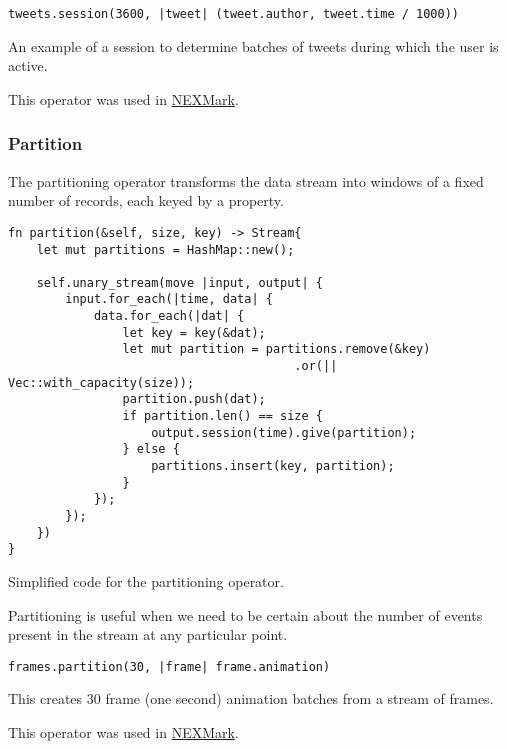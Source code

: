 \begin{listing}[H]
\begin{verbatim}
tweets.session(3600, |tweet| (tweet.author, tweet.time / 1000))
\end{verbatim}
\caption{An example of a session to determine batches of tweets during which the user is active.}
\label{lst:session-example}
\end{listing}

\noindent This operator was used in \hyperref[section:nexmark]{NEXMark}.

\subsubsection{Partition}
The partitioning operator transforms the data stream into windows of a fixed number of records, each keyed by a property.

\begin{listing}[H]
\begin{verbatim}
fn partition(&self, size, key) -> Stream{
    let mut partitions = HashMap::new();

    self.unary_stream(move |input, output| {
        input.for_each(|time, data| {
            data.for_each(|dat| {
                let key = key(&dat);
                let mut partition = partitions.remove(&key)
                                        .or(|| Vec::with_capacity(size));
                partition.push(dat);
                if partition.len() == size {
                    output.session(time).give(partition);
                } else {
                    partitions.insert(key, partition);
                }
            });
        });
    })
}
\end{verbatim}
  \caption{Simplified code for the partitioning operator.}
  \label{lst:reduce-to}
\end{listing}

Partitioning is useful when we need to be certain about the number of events present in the stream at any particular point.

\begin{listing}[H]
\begin{verbatim}
frames.partition(30, |frame| frame.animation)
\end{verbatim}
\caption{This creates 30 frame (one second) animation batches from a stream of frames.}
\label{lst:partition-example}
\end{listing}

\noindent This operator was used in \hyperref[section:nexmark]{NEXMark}.

